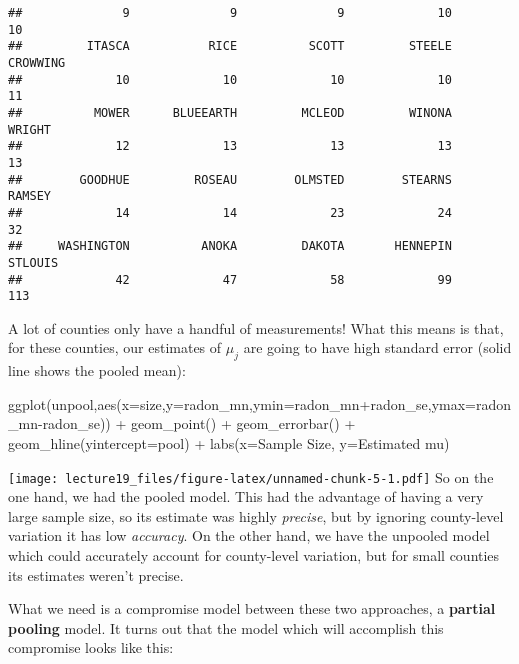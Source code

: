 \documentclass[
]{article}
\newenvironment{Shaded}{\begin{snugshade}}{\end{snugshade}}
\newcommand{\AttributeTok}[1]{\textcolor[rgb]{0.77,0.63,0.00}{#1}}
\newcommand{\FunctionTok}[1]{\textcolor[rgb]{0.00,0.00,0.00}{#1}}
\newcommand{\NormalTok}[1]{#1}
\newcommand{\SpecialCharTok}[1]{\textcolor[rgb]{0.00,0.00,0.00}{#1}}
\newcommand{\StringTok}[1]{\textcolor[rgb]{0.31,0.60,0.02}{#1}}
\begin{document}
\begin{verbatim}
##              9              9              9             10             10 
##         ITASCA           RICE          SCOTT         STEELE       CROWWING 
##             10             10             10             10             11 
##          MOWER      BLUEEARTH         MCLEOD         WINONA         WRIGHT 
##             12             13             13             13             13 
##        GOODHUE         ROSEAU        OLMSTED        STEARNS         RAMSEY 
##             14             14             23             24             32 
##     WASHINGTON          ANOKA         DAKOTA       HENNEPIN        STLOUIS 
##             42             47             58             99            113
\end{verbatim}

A lot of counties only have a handful of measurements! What this means
is that, for these counties, our estimates of \(\mu_j\) are going to
have high standard error (solid line shows the pooled mean):

\begin{Shaded}
\begin{Highlighting}[]
\FunctionTok{ggplot}\NormalTok{(unpool,}\FunctionTok{aes}\NormalTok{(}\AttributeTok{x=}\NormalTok{size,}\AttributeTok{y=}\NormalTok{radon\_mn,}\AttributeTok{ymin=}\NormalTok{radon\_mn}\SpecialCharTok{+}\NormalTok{radon\_se,}\AttributeTok{ymax=}\NormalTok{radon\_mn}\SpecialCharTok{{-}}\NormalTok{radon\_se)) }\SpecialCharTok{+}
  \FunctionTok{geom\_point}\NormalTok{() }\SpecialCharTok{+}
  \FunctionTok{geom\_errorbar}\NormalTok{() }\SpecialCharTok{+}
  \FunctionTok{geom\_hline}\NormalTok{(}\AttributeTok{yintercept=}\NormalTok{pool) }\SpecialCharTok{+}
  \FunctionTok{labs}\NormalTok{(}\AttributeTok{x=}\StringTok{\textquotesingle{}Sample Size\textquotesingle{}}\NormalTok{, }\AttributeTok{y=}\StringTok{\textquotesingle{}Estimated mu\textquotesingle{}}\NormalTok{)}
\end{Highlighting}
\end{Shaded}

\texttt{[image: lecture19\_files/figure-latex/unnamed-chunk-5-1.pdf]} So
on the one hand, we had the pooled model. This had the advantage of
having a very large sample size, so its estimate was highly
\emph{precise}, but by ignoring county-level variation it has low
\emph{accuracy}. On the other hand, we have the unpooled model which
could accurately account for county-level variation, but for small
counties its estimates weren't precise.

What we need is a compromise model between these two approaches, a
\textbf{partial pooling} model. It turns out that the model which will
accomplish this compromise looks like this:
\end{document}
